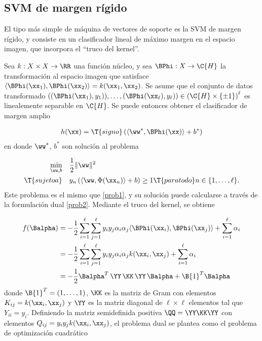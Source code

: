 \subsection{SVM de margen rígido}
El tipo más simple de máquina de vectores de soporte es la SVM de
margen rígido, y consiste en un clasificador lineal de máximo margen
en el espacio imagen, que incorpora el ``truco del kernel''.

Sea $k:X\times{}X\rightarrow\RR$ una función núcleo, y sea
$\BPhi:X\rightarrow\C{H}$ la transformación al espacio imagen que
satisface
$\left\langle\BPhi(\xx_1),\BPhi(\xx_2)\right\rangle=k(\xx_1,\xx_2)$.
Se asume que el conjunto de datos transformado
$\left((\BPhi(\xx_1),y_1)),\ldots,(\BPhi(\xx_\ell),y_\ell)\right)
\in\left(\C{H}\times\{\pm1\}\right)^\ell$ es linealemente separable en
$\C{H}$.  Se puede entonces obtener el clasificador de margen amplio

\begin{align}
  h(\xx)=\T{signo}\left(\langle\ww^*,\BPhi(\xx)\rangle+b^*\right)
\end{align}
en donde $\ww^*$, $b^*$ son solución al problema

\begin{align}
\label{svm-hardmargin}
  \begin{split}
    \min_{\ww,b} \quad & \frac{1}{2}\|\ww\|^2\\
    \T{sujeto a}\quad & y_n\left(\langle\ww,\Phi(\xx_n)\rangle+b\right)
    \geq 1 \T{ para todo } n\in\{1,\ldots,\ell\}.
  \end{split}
\end{align}
Este problema es el mismo que \autoref{prob1}, y su solución puede
calcularse a través de la formulación dual \autoref{prob2}. Mediante el
truco del kernel, se obtiene

\begin{align}
  f(\Balpha)
  & = -\frac{1}{2}\sum_{i=1}^\ell\sum_{j=1}^\ell
    y_iy_j\alpha_i\alpha_j \langle \BPhi(\xx_i),\BPhi(\xx_j) \rangle +
    \sum_{i=1}^{\ell} \alpha_i \notag\\
  & = -\frac{1}{2}\sum_{i=1}^\ell\sum_{j=1}^\ell
    y_iy_j\alpha_i\alpha_j k(\xx_i,\xx_j) + \sum_{i=1}^{\ell} \alpha_i
    \notag \\
  & = -\frac{1}{2}\Balpha^T\,\YY\,\KK\,\YY\,\Balpha
    + \B{1}^T\Balpha  
\end{align}
donde $\B{1}^T=(1,\ldots,1)$, $\KK$ es la matriz de Gram con elementos
$K_{ij}=k(\xx_i,\xx_j)$ y $\YY$ es la matriz diagonal de
$\ell\times\ell$ elementos tal que $Y_{ii}=y_i$.
Definiendo la matriz semidefinida positiva $\QQ=\YY\KK\YY$ con elementos
$Q_{ij}=y_iy_jk(\xx_i,\xx_j)$, el problema dual se plantea como
el problema de optimización cuadrático

